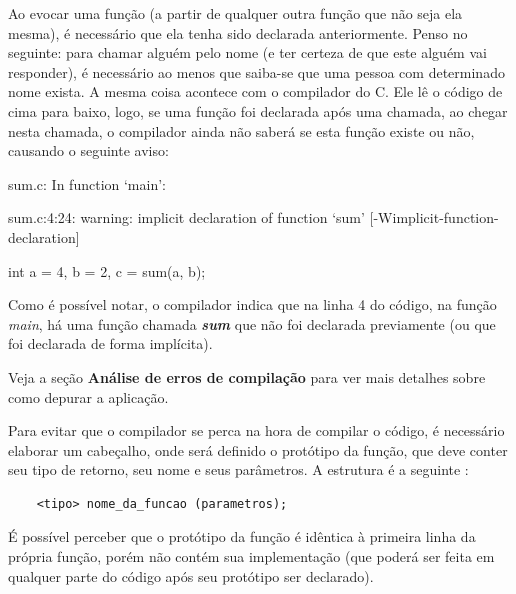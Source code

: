 \documentclass[12pt]{article}
\newcommand\tab[1][1cm]{\hspace*{#1}}
\begin{document}
\par\tab Ao evocar uma função (a partir de qualquer outra função que não seja ela mesma), é necessário que ela tenha sido declarada anteriormente. Penso no seguinte: para chamar alguém pelo nome (e ter certeza de que este alguém vai responder), é necessário ao menos que saiba-se que uma pessoa com determinado nome exista. A mesma coisa acontece com o compilador do C. Ele lê o código de cima para baixo, logo, se uma função foi declarada após uma chamada, ao chegar nesta chamada, o compilador ainda não saberá se esta função existe ou não, causando o seguinte aviso:

\hspace{0.25cm}
\begin{tcolorbox}[colback=black!5!white,colframe=black!75!white,title=Console: usuario@fedora:\~/Exemplos]
    \par sum.c: In function ‘main’:
    \par sum.c:4:24: warning: implicit declaration of function ‘sum’ [-Wimplicit-function-declaration]
    \par\tab int a = 4, b = 2, c = sum(a, b);
\end{tcolorbox}

\par\tab Como é possível notar, o compilador indica que na linha 4 do código, na função \textit{main}, há uma função chamada \textit{\textbf{sum}} que não foi declarada previamente (ou que foi declarada de forma implícita).

\hspace{0.25cm}
\begin{tcolorbox}[colback=violet!5!white,colframe=violet!75!black,title=Dica!]
  \par\tab Veja a seção \textbf{Análise de erros de compilação} para ver mais detalhes sobre como depurar a aplicação.
\end{tcolorbox}

\par\tab Para evitar que o compilador se perca na hora de compilar o código, é necessário elaborar um cabeçalho, onde será definido o protótipo da função, que deve conter seu tipo de retorno, seu nome e seus parâmetros. A estrutura é a seguinte :

\hspace{0.25cm}
\begin{lstlisting}
    <tipo> nome_da_funcao (parametros);
\end{lstlisting}

\par\tab É possível perceber que o protótipo da função é idêntica à primeira linha da própria função, porém não contém sua implementação (que poderá ser feita em qualquer parte do código após seu protótipo ser declarado).
\end{document}
